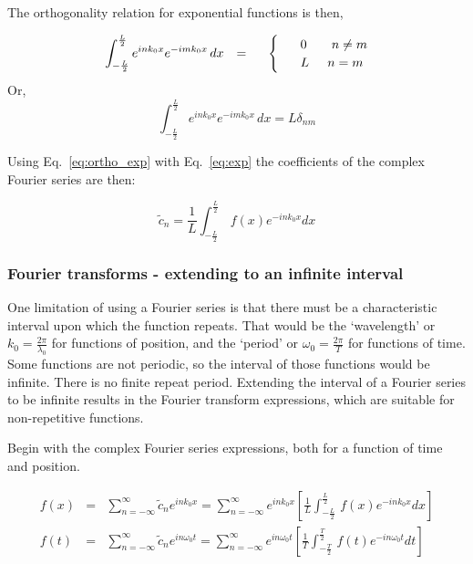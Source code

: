 \documentclass[12pt]{article}
\begin{document}
\begin{flushleft}
\vspace{.3in}
The orthogonality relation for exponential functions is then,

\begin{equation}
\int_{-\frac{L}{2}}^{\frac{L}{2}} e^{ink_{0}x}e^{-imk_{0}x} \, dx \hspace{.1in} = \hspace{.2in}
\begin{cases}
 & \hspace{.1in} 0 \hspace{.27in}  n \neq m \\
 & \hspace{.1in} L  \hspace{.2in}  n=m
\end{cases}
\label{eq:ortho_exp}
\end{equation}
Or,
\[
\int_{-\frac{L}{2}}^{\frac{L}{2}} e^{ink_{0}x}e^{-imk_{0}x} \, dx  = L\delta_{nm}
\]

Using Eq.~\ref{eq:ortho_exp} with Eq.~\ref{eq:exp} the coefficients of the complex Fourier series are then:

\[
\tilde{c}_{n}= \frac{1}{L} \int_{-\frac{L}{2}}^{\frac{L}{2}} \, f(x)e^{-ink_{0}x} dx
\]

\subsubsection*{\color{myblue} {Fourier transforms - extending to an infinite interval} }

One limitation of using a Fourier series is that there must be a characteristic interval upon which the function repeats.  That would be the `wavelength' or $k_{0}=\frac{2\pi}{\lambda_{0}}$ for functions of position, and the `period' or $\omega_{0}=\frac{2\pi}{T}$ for functions of time.  Some functions are not periodic, so the interval of those functions would be infinite.  There is no finite repeat period.  Extending the interval of a Fourier series to be infinite results in the Fourier transform expressions, which are suitable for non-repetitive functions.

Begin with the complex Fourier series expressions, both for a function of time and position.

\begin{eqnarray*}
f(x) & =& \sum_{n=-\infty}^{\infty} \tilde{c}_{n}e^{ink_{0}x} = \sum_{n=-\infty}^{\infty} e^{ink_{0}x} \left[ \frac{1}{L} \int_{-\frac{L}{2}}^{\frac{L}{2}} \, f(x)e^{-ink_{0}x} dx \right] \\
f(t) & = & \sum_{n=-\infty}^{\infty} \tilde{c}_{n}e^{in\omega_{0}t} = \sum_{n=-\infty}^{\infty} e^{in\omega_{0}t} \left[ \frac{1}{T} \int_{-\frac{T}{2}}^{\frac{T}{2}} \, f(t)e^{-in\omega_{0}t} dt \right]
\end{eqnarray*}


\end{flushleft}
\end{document}
